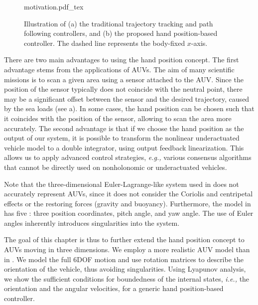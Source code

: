 \begin{figure}[t]
    \centering
    \def\svgwidth{0.75\textwidth}
    {motivation.pdf_tex}
    \caption{Illustration of (a) the traditional trajectory tracking and path following controllers, and (b) the proposed hand position-based controller. The dashed line represents the body-fixed $x$-axis.}
    \label{fig:handpos_def_motivation}
\end{figure}

There are two main advantages to using the hand position concept.
The first advantage stems from the applications of AUVs.
The aim of many scientific missions is to scan a given area using a sensor attached to the AUV.
Since the position of the sensor typically does not coincide with the neutral point, there may be a significant offset between the sensor and the desired trajectory, caused by the sea loads (see a).
In some cases, the hand position can be chosen such that it coincides with the position of the sensor, allowing to scan the area more accurately.
The second advantage is that if we choose the hand position as the output of our system, it is possible to transform the nonlinear underactuated vehicle model to a double integrator, using output feedback linearization.
This allows us to apply advanced control strategies, \emph{e.g.,} various consensus algorithms \cite{cai_hand-position-rigidity-planar_2015,li_hand-position-rigidity-3d_2021,lawton_hand-position-formation_2003,restrepo_formation_2022} that cannot be directly used on nonholonomic or underactuated vehicles.

Note that the three-dimensional Euler-Lagrange-like system used in \cite{li_hand-position-rigidity-3d_2021} does not accurately represent AUVs, since it does not consider the Coriolis and centripetal effects or the restoring forces (gravity and buoyancy).
Furthermore, the model in \cite{li_hand-position-rigidity-3d_2021} has five : three position coordinates, pitch angle, and yaw angle.
The use of Euler angles inherently introduces singularities into the system.

The goal of this chapter is thus to further extend the hand position concept to AUVs moving in three dimensions.
We employ a more realistic AUV model than in \cite{li_hand-position-rigidity-3d_2021}. We model the full 6DOF motion and use rotation matrices to describe the orientation of the vehicle, thus avoiding singularities.
Using Lyapunov analysis, we show the sufficient conditions for boundedness of the internal states, \emph{i.e.,} the orientation and the angular velocities, for a generic hand position-based controller.

